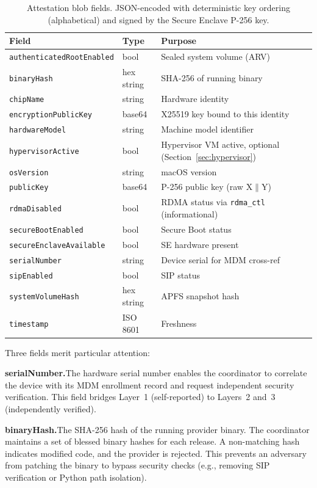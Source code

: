 \documentclass[10pt,twocolumn,letterpaper]{article}
\begin{document}
\begin{table}[h]
\centering
\caption{Attestation blob fields. JSON-encoded with deterministic key ordering (alphabetical) and signed by the Secure Enclave P-256 key.}
\vspace{4pt}
\scriptsize
\begin{tabular}{@{}llp{3.0cm}@{}}
\toprule
\textbf{Field} & \textbf{Type} & \textbf{Purpose} \\
\midrule
\texttt{authenticatedRootEnabled} & bool & Sealed system volume (ARV) \\
\texttt{binaryHash} & hex string & SHA-256 of running binary \\
\texttt{chipName} & string & Hardware identity \\
\texttt{encryptionPublicKey} & base64 & X25519 key bound to this identity \\
\texttt{hardwareModel} & string & Machine model identifier \\
\texttt{hypervisorActive} & bool & Hypervisor VM active, optional (Section~\ref{sec:hypervisor}) \\
\texttt{osVersion} & string & macOS version \\
\texttt{publicKey} & base64 & P-256 public key (raw X$\|$Y) \\
\texttt{rdmaDisabled} & bool & RDMA status via \texttt{rdma\_ctl} (informational) \\
\texttt{secureBootEnabled} & bool & Secure Boot status \\
\texttt{secureEnclaveAvailable} & bool & SE hardware present \\
\texttt{serialNumber} & string & Device serial for MDM cross-ref \\
\texttt{sipEnabled} & bool & SIP status \\
\texttt{systemVolumeHash} & hex string & APFS snapshot hash \\
\texttt{timestamp} & ISO 8601 & Freshness \\
\bottomrule
\end{tabular}
\end{table}

Three fields merit particular attention:

\textbf{serialNumber.}\quad The hardware serial number enables the coordinator to correlate the device with its MDM enrollment record and request independent security verification. This field bridges Layer~1 (self-reported) to Layers~2 and~3 (independently verified).

\textbf{binaryHash.}\quad The SHA-256 hash of the running provider binary. The coordinator maintains a set of blessed binary hashes for each release. A non-matching hash indicates modified code, and the provider is rejected. This prevents an adversary from patching the binary to bypass security checks (e.g., removing SIP verification or Python path isolation).
\end{document}
